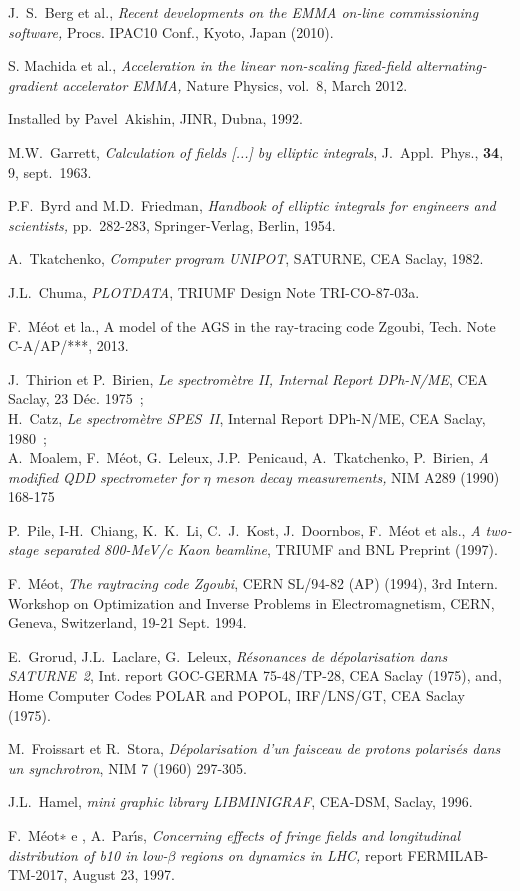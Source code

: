 \begin{thebibliography}{99}
J.~S.~Berg et al., 
\textsl{Recent developments on the EMMA on-line commissioning software,} 
Procs. IPAC10 Conf., Kyoto, Japan (2010). 

S. Machida et al., 
\textsl{Acceleration in the linear non-scaling fixed-field alternating-gradient accelerator EMMA, }
Nature Physics, vol.~8, March 2012.

 Installed by Pavel~Akishin, JINR, Dubna, 1992.

M.W.~Garrett, 
\textsl{Calculation of fields  [...] by elliptic integrals}, 
J.~Appl.~Phys., \textbf{34}, 9, sept.~1963.  

P.F.~Byrd and M.D.~Friedman, 
\textsl{Handbook of elliptic integrals for engineers and scientists,} 
pp.~282-283, Springer-Verlag, Berlin, 1954.  

A.~Tkatchenko, 
\textsl{Computer program UNIPOT}, 
SATURNE, CEA Saclay, 1982. 

J.L.~Chuma, 
\textsl{PLOTDATA}, 
TRIUMF Design Note TRI-CO-87-03a.

F.~M\'eot et la., 
A model of the AGS in the ray-tracing code Zgoubi, 
Tech. Note C-A/AP/***, 2013. 

J.~Thirion et P.~Birien, 
\textsl{Le spectrom\`etre II, Internal Report DPh-N/ME}, 
CEA Saclay, 23 D\'ec. 1975~; \\
H.~Catz, 
\textsl{Le spectrom\`etre SPES~II}, Internal Report DPh-N/ME, CEA Saclay, 1980~; \\
 A.~Moalem, F.~M\'eot, G.~Leleux, J.P.~Penicaud, A.~Tkatchenko, P.~Birien,  
\textsl{A modified QDD spectrometer for $\eta$ meson decay measurements,  } 
NIM A289 (1990) 168-175 

P.~Pile, I-H.~Chiang, K.~K.~Li, C.~J.~Kost, J.~Doornbos, F.~M\'eot et als., 
\textsl{A two-stage separated 800-MeV/c Kaon beamline}, 
 TRIUMF and BNL Preprint (1997).

F.~M\'eot, 
\textsl{The raytracing code Zgoubi}, CERN SL/94-82 (AP) (1994), 
3rd Intern. Workshop on Optimization and Inverse Problems 
in Electromagnetism, CERN, Geneva, Switzerland, 19-21 Sept. 1994. 

E.~Grorud, J.L.~Laclare, G.~Leleux, 
\textsl{R\'esonances de d\'epolarisation dans SATURNE~2}, 
Int. report GOC-GERMA 75-48/TP-28, CEA Saclay (1975), 
and, Home Computer Codes POLAR and POPOL, IRF/LNS/GT, CEA Saclay (1975).

M.~Froissart et R.~Stora, 
\textsl{D\'epolarisation d'un faisceau de protons polaris\'es dans un synchrotron},
 NIM 7 (1960) 297-305.

J.L.~Hamel, 
\textsl{mini graphic library LIBMINIGRAF}, 
CEA-DSM, Saclay, 1996.

F.~M\'eot∗ e , A.~Par\'{\i}s, 
\textsl{Concerning effects of fringe fields and longitudinal distribution of b10 in
low-$\beta$ regions on dynamics in LHC, } 
report FERMILAB-TM-2017, August 23, 1997. 

\end{thebibliography}



